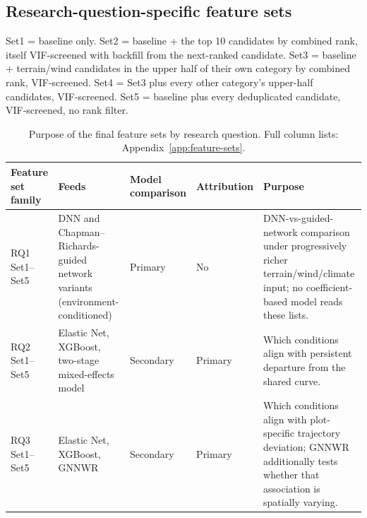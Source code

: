 
\subsection{Research-question-specific feature sets}
\label{sec:feature-final}

Set1 = baseline only. Set2 = baseline + the top 10 candidates by combined rank, itself
VIF-screened with backfill from the next-ranked candidate. Set3 = baseline + terrain/wind
candidates in the upper half of their own category by combined rank, VIF-screened. Set4 = Set3
plus every other category's upper-half candidates, VIF-screened. Set5 = baseline plus every
deduplicated candidate, VIF-screened, no rank filter.

\begin{table}[!htbp]
\centering
\scriptsize
\renewcommand{\arraystretch}{1.2}
\begin{tabular}{p{2.3cm}p{4.2cm}p{1.6cm}p{2cm}p{3.4cm}}
\toprule
Feature set family & Feeds & Model comparison & Attribution & Purpose \\
\midrule
RQ1 Set1--Set5 & DNN and Chapman--Richards-guided network variants (environment-conditioned) &
Primary & No & DNN-vs-guided-network comparison under progressively richer terrain/wind/climate
input; no coefficient-based model reads these lists. \\
RQ2 Set1--Set5 & Elastic Net, XGBoost, two-stage mixed-effects model & Secondary & Primary & Which
conditions align with persistent departure from the shared curve. \\
RQ3 Set1--Set5 & Elastic Net, XGBoost, GNNWR & Secondary & Primary & Which conditions align with
plot-specific trajectory deviation; GNNWR additionally tests whether that association is
spatially varying. \\
\bottomrule
\end{tabular}
\caption{Purpose of the final feature sets by research question. Full column lists: Appendix~\ref{app:feature-sets}.}
\label{tab:feature-set-purpose}
\end{table}

